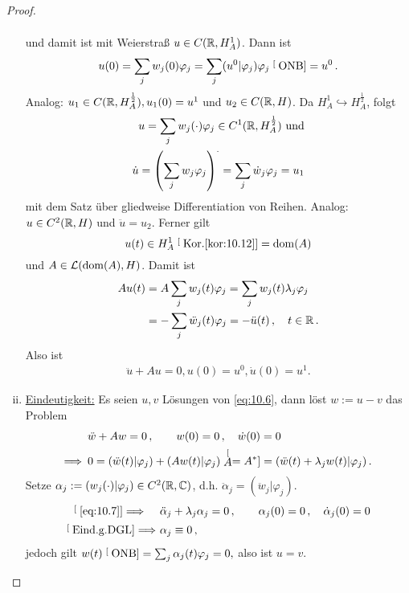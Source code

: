 \begin{proof}
\begin{enumerate}[(i)]
\begin{align*}
\end{align*}
und damit ist mit Weierstraß $u \in C(\mathbb{R},H^1_A)$. Dann ist
\[
	u(0) = \sum_j w_j(0) \varphi_j = \sum_j (u^0|\varphi_j)\varphi_j \stackrel[\scriptsize\text{ONB}]{}= u^0 \, .
\]
Analog: $u_1 \in C(\mathbb{R},H^{\frac 12}_A), u_1(0) = u^1$ und $u_2\in C(\mathbb{R},H)$. Da $H^1_A \hookrightarrow H_A^{\frac 12}$, folgt 
\begin{align*}
	u = \sum_j w_j(\cdot) \varphi_j \in C^1(\mathbb{R},H^{\frac 12}_A) \text{ und} \\
	\dot u = \left( \sum_j w_j \varphi_j\right)^\cdot = \sum_j \dot w_j \varphi_j = u_1
\end{align*}
mit dem Satz über gliedweise Differentiation von Reihen. Analog: $u \in C^2(\mathbb{R},H)$ und $\ddot u = u_2$. Ferner gilt
\[
	u(t)  \in H^1_A \stackrel[\scriptsize\text{Kor.}\ref{kor:10.12}]{}= \operatorname{dom} (A)
\]
und $A \in \mathcal L(\operatorname{dom} (A),H)$. Damit ist
\begin{align*}
	Au(t) &= A \sum_j w_j (t) \varphi_j = \sum_j w_j(t) \lambda_j \varphi_j \\
	&=-\sum_j \ddot w_j(t) \varphi_j = -\ddot u(t) \, , \quad t \in \mathbb{R} \, .
\end{align*}
Also ist
\begin{align}
\label{eq:10.6}
	\ddot u + Au = 0, u(0) = u^0, \dot u(0) = u^1.
\end{align}
\item \underline{Eindeutigkeit:} Es seien $u,v$ Lösungen von \eqref{eq:10.6}, dann löst $w:=u-v$ das Problem
\begin{align}
\label{eq:10.7}
	& \ddot w + Aw = 0 \, , \qquad w(0) = 0 \, , \quad \dot w (0) = 0 \notag \\
	\Longrightarrow \,\, \,  & 0 = (\ddot w(t)|\varphi_j) + (Aw(t)|\varphi_j) \stackrel[A=A^\ast]{}= (\ddot w(t)  + \lambda_j w(t) |\varphi_j ) \, .
\end{align}
Setze $\alpha_j := (w_j(\cdot)|\varphi_j) \in C^2(\mathbb{R},\mathbb{C})$, d.h. $\ddot \alpha_j = (\ddot w_j |\varphi_j)$.
\begin{align*}
	\stackrel[\scriptsize\eqref{eq:10.7}]{}\Longrightarrow \hspace{1.4em}& \ddot \alpha_j + \lambda_j \alpha_j = 0 \, , \qquad \alpha_j(0) = 0 \, , \quad \dot \alpha_j (0 ) = 0 \\
	\stackrel[\scriptsize\text{Eind.g.DGL}]{}\Longrightarrow \, \, & \alpha_j \equiv 0 \, ,
\end{align*}
jedoch gilt $w(t) \stackrel[\scriptsize\text{ONB}]{}= \sum_j \alpha_j(t) \varphi_j = 0, $  also ist $u=v$.\qedhere
\end{enumerate}
\end{proof}

